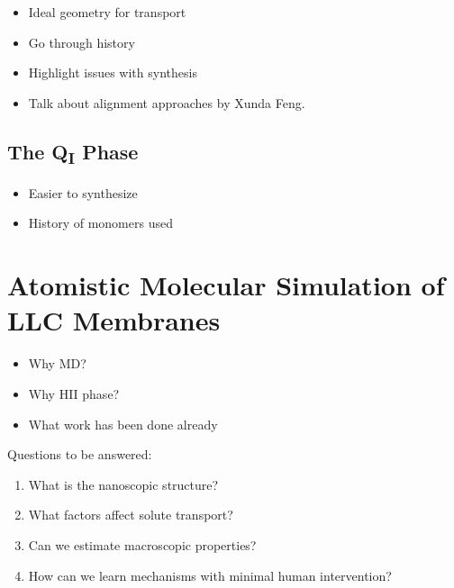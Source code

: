   \begin{itemize}
    \item Ideal geometry for transport
    \item Go through history
    \item Highlight issues with synthesis
    \item Talk about alignment approaches by Xunda Feng.
  \end{itemize}
  
  \subsection{The Q\textsubscript{I} Phase}
  
  \begin{itemize}
    \item Easier to synthesize
    \item History of monomers used
  \end{itemize}
  
  \section{Atomistic Molecular Simulation of LLC Membranes}
  
  \begin{itemize}
    \item Why MD?
    \item Why HII phase?
    \item What work has been done already
  \end{itemize}

  Questions to be answered: %
  \begin{enumerate}
    \item What is the nanoscopic structure?
    \item What factors affect solute transport?
    \item Can we estimate macroscopic properties?
    \item How can we learn mechanisms with minimal human intervention?  %
  \end{enumerate} 